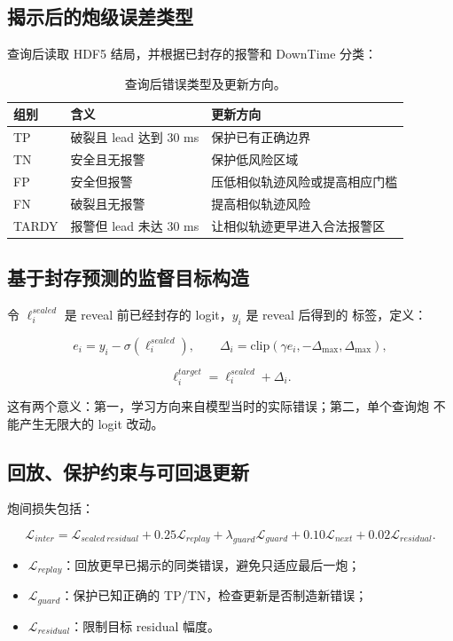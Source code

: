 \documentclass[11pt,a4paper]{article}
\begin{document}
\subsection{揭示后的炮级误差类型}

查询后读取 HDF5 结局，并根据已封存的报警和 DownTime 分类：

\begin{table}[H]
\centering
\caption{查询后错误类型及更新方向。}
\begin{tabularx}{\textwidth}{l l Y}
\toprule
组别 & 含义 & 更新方向\\
\midrule
TP & 破裂且 lead 达到 30 ms & 保护已有正确边界\\
TN & 安全且无报警 & 保护低风险区域\\
FP & 安全但报警 & 压低相似轨迹风险或提高相应门槛\\
FN & 破裂且无报警 & 提高相似轨迹风险\\
TARDY & 报警但 lead 未达 30 ms & 让相似轨迹更早进入合法报警区\\
\bottomrule
\end{tabularx}
\end{table}

\subsection{基于封存预测的监督目标构造}

令 \(\ell_i^{sealed}\) 是 reveal 前已经封存的 logit，\(y_i\) 是 reveal 后得到的
标签，定义：

\[
e_i=y_i-\sigma(\ell_i^{sealed}),
\qquad
\Delta_i=\mathrm{clip}(\gamma e_i,-\Delta_{\max},\Delta_{\max}),
\]

\[
\ell_i^{target}
=\ell_i^{sealed}+\Delta_i.
\]

这有两个意义：第一，学习方向来自模型当时的实际错误；第二，单个查询炮
不能产生无限大的 logit 改动。

\subsection{回放、保护约束与可回退更新}

炮间损失包括：

\[
\mathcal{L}_{inter}
=\mathcal{L}_{sealed\ residual}
+0.25\mathcal{L}_{replay}
+\lambda_{guard}\mathcal{L}_{guard}
+0.10\mathcal{L}_{next}
+0.02\mathcal{L}_{residual}.
\]

\begin{itemize}
\item \(\mathcal{L}_{replay}\)：回放更早已揭示的同类错误，避免只适应最后一炮；
\item \(\mathcal{L}_{guard}\)：保护已知正确的 TP/TN，检查更新是否制造新错误；
\item \(\mathcal{L}_{residual}\)：限制目标 residual 幅度。
\end{itemize}
\end{document}
